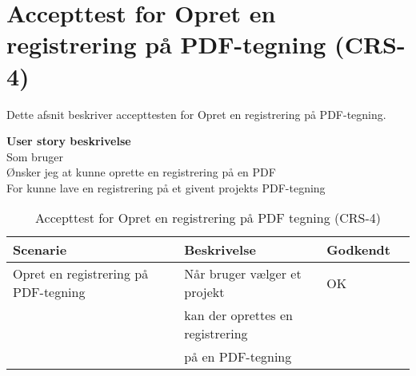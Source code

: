 \section{Accepttest for Opret en registrering på PDF-tegning (CRS-4)}
Dette afsnit beskriver accepttesten for Opret en registrering på PDF-tegning.

\textbf{User story beskrivelse} \\
Som bruger \\
Ønsker jeg at kunne oprette en registrering på en PDF \\
For kunne lave en registrering på et givent projekts PDF-tegning

\begin{table}[H]
	\centering
	\begin{tabular}{|ll|l|ll|} \hline
		\textbf{Scenarie} &  & \textbf{Beskrivelse}&  \textbf{Godkendt}&  \\ \hline
		Opret en registrering på PDF-tegning&  &  Når bruger vælger et projekt &  OK&  \\
		& & kan der oprettes en registrering& & \\ 
			& & på en PDF-tegning& & \\ \hline
	\end{tabular}
	\caption{Accepttest for Opret en registrering på PDF tegning (CRS-4)}
	\label{AcceptPDF}
\end{table}

\clearpage